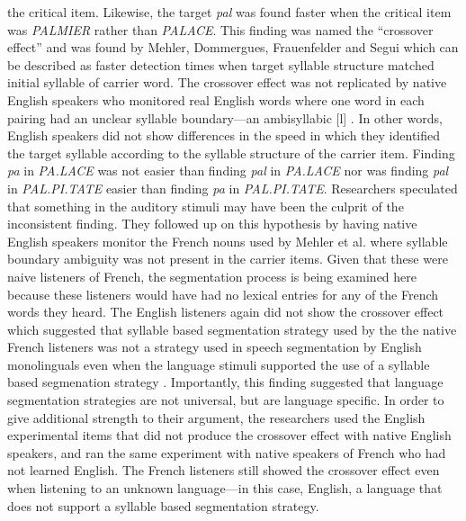 the critical item. Likewise, the target \emph{pal} was found faster when the critical item was \emph{PALMIER} rather than \emph{PALACE}\citep{Mehler1981-vi}. This finding was named the “crossover effect” and was found by Mehler, Dommergues, Frauenfelder and Segui \parencite*{Mehler1981-vi} which can be described as faster detection times when target syllable structure matched initial syllable of carrier word. The crossover effect was not replicated by native English speakers who monitored real English words where one word in each pairing had an unclear syllable boundary---an ambisyllabic [l] \parencite{Cutler1986-zl}. In other words, English speakers did not show differences in the speed in which they identified the target syllable according to the syllable structure of the carrier item. Finding \emph{pa} in \emph{PA.LACE} was not easier than finding \emph{pal} in \emph{PA.LACE} nor was finding \emph{pal} in \emph{PAL.PI.TATE} easier than finding \emph{pa} in \emph{PAL.PI.TATE}. Researchers speculated that something in the auditory stimuli may have been the culprit of the inconsistent finding. They followed up on this hypothesis by having native English speakers monitor the French nouns used by Mehler et al. \parencite*{Mehler1981-vi} where syllable boundary ambiguity was not present in the carrier items. Given that these were naive listeners of French, the segmentation process is being examined here because these listeners would have had no lexical entries for any of the French words they heard. The English listeners again did not show the crossover effect which suggested that syllable based segmentation strategy used by the the native French listeners was not a strategy used in speech segmentation by English monolinguals even when the language stimuli supported the use of a syllable based segmenation strategy \parencite{Cutler1986-zl}. Importantly, this finding suggested that language segmentation strategies are not universal, but are language specific. In order to give additional strength to their argument, the researchers used the English experimental items that did not produce the crossover effect with native English speakers, and ran the same experiment with native speakers of French who had not learned English. The French listeners still showed the crossover effect even when listening to an unknown language—in this case, English, a language that does not support a syllable based segmentation strategy. 
